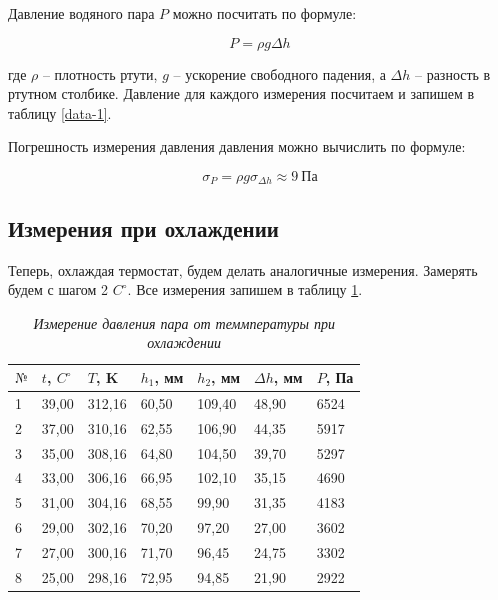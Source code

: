 \documentclass[a4paper,12pt]{article}
\begin{document}
Давление водяного пара $P$ можно посчитать по формуле:

\begin{equation}
    P = \rho g \Delta h
\end{equation}

где $\rho$ -- плотность ртути, $g$ -- ускорение свободного падения, а $\Delta h$ -- разность в ртутном столбике. Давление для каждого измерения посчитаем и запишем в таблицу \ref{data-1}.

Погрешность измерения давления давления можно вычислить по формуле:

\begin{equation}
    \sigma_P = \rho g \sigma_{\Delta h} \approx 9 \ \text{Па}
\end{equation}

\subsection{Измерения при охлаждении}

Теперь, охлаждая термостат, будем делать аналогичные измерения. Замерять будем с шагом 2 $C^\circ$. Все измерения запишем в таблицу \ref{data-2}.

\begin{table}[!ht]
    \centering
    \begin{tabular}{|l|l|l|l|l|l|l|}
    \hline
        $№$ & $t$, $C^\circ$ & $T$, K & $h_1$, мм & $h_2$, мм & $\Delta h$, мм & $P$, Па \\ \hline
        1 & 39,00 & 312,16 & 60,50 & 109,40 & 48,90 & 6524 \\ \hline
        2 & 37,00 & 310,16 & 62,55 & 106,90 & 44,35 & 5917 \\ \hline
        3 & 35,00 & 308,16 & 64,80 & 104,50 & 39,70 & 5297 \\ \hline
        4 & 33,00 & 306,16 & 66,95 & 102,10 & 35,15 & 4690 \\ \hline
        5 & 31,00 & 304,16 & 68,55 & 99,90 & 31,35 & 4183 \\ \hline
        6 & 29,00 & 302,16 & 70,20 & 97,20 & 27,00 & 3602 \\ \hline
        7 & 27,00 & 300,16 & 71,70 & 96,45 & 24,75 & 3302 \\ \hline
        8 & 25,00 & 298,16 & 72,95 & 94,85 & 21,90 & 2922 \\ \hline
    \end{tabular}\caption{\textit{Измерение давления пара от теммпературы при охлаждении}}\label{data-2}
\end{table}
\end{document}
